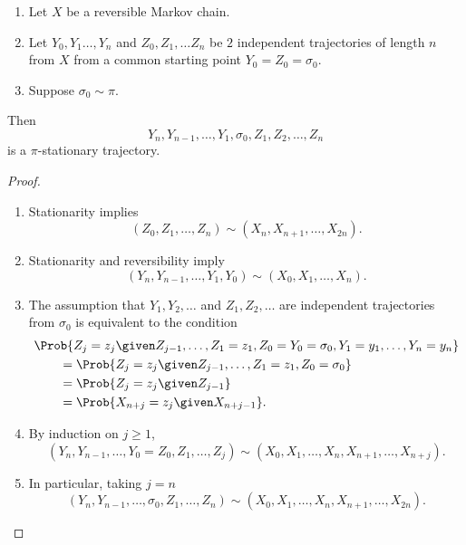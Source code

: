 \documentclass[12pt]{article}
\begin{document}
\begin{lemma}
    \begin{enumerate}
        \item
            Let \( X \) be a reversible Markov chain.
        \item
            Let \( Y_0, Y_1 \dots, Y_n \) and \( Z_0, Z_1, \dots Z_n \)
            be \( 2 \) independent trajectories of length \( n \) from \(
            X \) from a common starting point \( Y_0 = Z_0 = \sigma_0 \).
        \item
            Suppose \( \sigma_0 \sim \pi \).
    \end{enumerate}
    Then
            \[
                Y_n, Y_{n-1}, \dots, Y_1, \sigma_0, Z_1, Z_2, \dots, Z_n
            \] is a \( \pi \)-stationary trajectory.
\end{lemma}

\begin{proof}
            \begin{enumerate}
                \item
                    Stationarity implies
                    \[
                        (Z_0, Z_1, \dots, Z_n) \sim (X_n, X_{n+1}, \dots,
                        X_{2n}).
                    \] 
                  \item Stationarity and reversibility imply
                    \[
                        (Y_n, Y_{n-1}, \dots, Y_1, Y_0) \sim (X_0, X_1,
                        \dots, X_n).
                    \]
                \item
                    The assumption that \( Y_1, Y_2, \dots \) and \( Z_1,
                    Z_2, \dots \) are independent trajectories from \(
                    \sigma_0 \) is equivalent to the condition
                    \begin{align*}
                        & \Prob{ Z_j = z_j \given Z_{j-1}, \dots, Z_1 =
                        z_1, Z_0 = Y_0=\sigma_0, Y_1=y_1, \dots, Y_n = y_n}
                        \\
                        & \qquad = \Prob{ Z_j = z_j \given Z_{j-1},
                        \dots, Z_1 = z_1, Z_0 = \sigma_0} \\
                        & \qquad = \Prob{ Z_j = z_j \given Z_{j-1}} \\
                        &\qquad = \Prob{ X_{n+j} = z_j \given X_{n+j-1}}.
                    \end{align*}
                \item
                    By induction on \( j \ge 1 \),
                    \[
                        (Y_n, Y_{n-1}, \dots, Y_0=Z_0, Z_1, \dots, Z_j)
                        \sim (X_0, X_1, \dots, X_n, X_{n+1}, \dots, X_{n+j}).
                    \]
                \item
                    In particular, taking \( j = n \)
                    \[
                        (Y_n, Y_{n-1}, \dots, \sigma_0, Z_1, \dots, Z_n)
                        \sim (X_0, X_1, \dots, X_n, X_{n+1}, \dots, X_{2n}).
                    \]
            \end{enumerate}
\end{proof}
\end{document}
